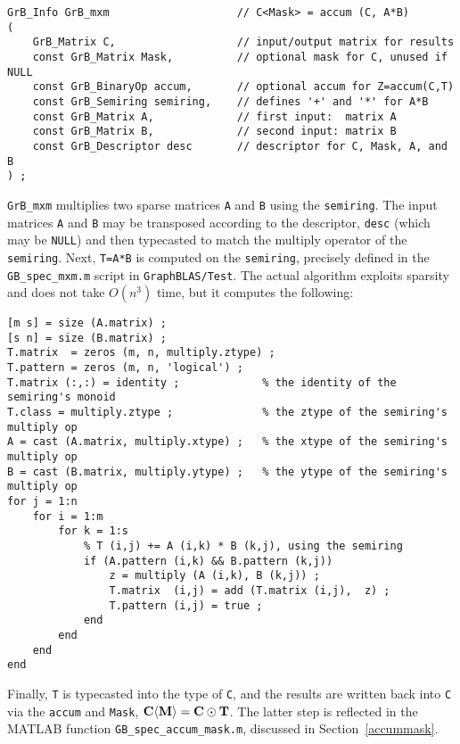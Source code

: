\documentclass[12pt]{article}
\begin{document}
{\begin{mdframed}[userdefinedwidth=6in]
{\footnotesize
\begin{verbatim}
GrB_Info GrB_mxm                    // C<Mask> = accum (C, A*B)
(
    GrB_Matrix C,                   // input/output matrix for results
    const GrB_Matrix Mask,          // optional mask for C, unused if NULL
    const GrB_BinaryOp accum,       // optional accum for Z=accum(C,T)
    const GrB_Semiring semiring,    // defines '+' and '*' for A*B
    const GrB_Matrix A,             // first input:  matrix A
    const GrB_Matrix B,             // second input: matrix B
    const GrB_Descriptor desc       // descriptor for C, Mask, A, and B
) ;
\end{verbatim} } \end{mdframed}

\verb'GrB_mxm' multiplies two sparse matrices \verb'A' and \verb'B' using the
\verb'semiring'.  The input matrices \verb'A' and \verb'B' may be transposed
according to the descriptor, \verb'desc' (which may be \verb'NULL') and then
typecasted to match the multiply operator of the \verb'semiring'.  Next,
\verb'T=A*B' is computed on the \verb'semiring', precisely defined in the
\verb'GB_spec_mxm.m' script in \verb'GraphBLAS/Test'.  The actual algorithm
exploits sparsity and does not take $O(n^3)$ time, but it computes the
following:

{\footnotesize
\begin{verbatim}
[m s] = size (A.matrix) ;
[s n] = size (B.matrix) ;
T.matrix  = zeros (m, n, multiply.ztype) ;
T.pattern = zeros (m, n, 'logical') ;
T.matrix (:,:) = identity ;             % the identity of the semiring's monoid
T.class = multiply.ztype ;              % the ztype of the semiring's multiply op
A = cast (A.matrix, multiply.xtype) ;   % the xtype of the semiring's multiply op
B = cast (B.matrix, multiply.ytype) ;   % the ytype of the semiring's multiply op
for j = 1:n
    for i = 1:m
        for k = 1:s
            % T (i,j) += A (i,k) * B (k,j), using the semiring
            if (A.pattern (i,k) && B.pattern (k,j))
                z = multiply (A (i,k), B (k,j)) ;
                T.matrix  (i,j) = add (T.matrix (i,j),  z) ;
                T.pattern (i,j) = true ;
            end
        end
    end
end \end{verbatim}}

Finally, \verb'T' is typecasted into the type of \verb'C', and the results are
written back into \verb'C' via the \verb'accum' and \verb'Mask', ${\bf C
\langle M \rangle  = C \odot T}$.  The latter step is reflected in the MATLAB
function \verb'GB_spec_accum_mask.m', discussed in Section~\ref{accummask}.

}
\end{document}
